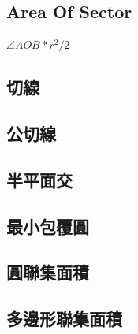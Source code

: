 \documentclass[a4paper,10pt,twocolumn,oneside]{article}
\newcommand{\inputcpp}[1]{}  %
\begin{document}
\subsection{Area Of Sector}
$\angle AOB * r^2 / 2$
\inputcpp{geometry/AreaOfSector.cpp}

\subsection{切線}
\inputcpp{geometry/TangentLinesOfCirclePoint.cpp}

\subsection{公切線}
\inputcpp{geometry/TangentLinesOfCircles.cpp}

\subsection{半平面交}
\inputcpp{geometry/HalfPlaneIntersection.cpp}

\subsection{最小包覆圓}
\inputcpp{geometry/MinimalEnclosingCircle.cpp}

\subsection{圓聯集面積}
\inputcpp{geometry/UnionOfCircles.cpp}

\subsection{多邊形聯集面積}
\inputcpp{geometry/UnionOfPolygons.cpp}








\end{document}
